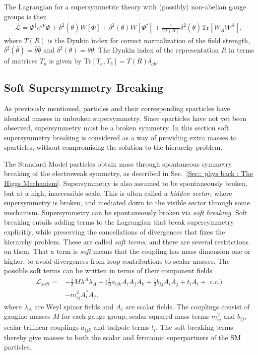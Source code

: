 \documentclass[twoside,english]{uiofysmaster}
\begin{document}
The Lagrangian for a supersymmetric theory with (possibly) non-abelian gauge groups is then
\begin{align}
\mathcal{L} = \Phi^{\dagger} e^{qV} \Phi + \delta^2 (\bar{\theta}) W[\Phi] + \delta^2 (\theta) W[\Phi^{\dagger}] + \frac{1}{2T(R)} \delta^2 (\bar{\theta}) \text{Tr}[W_AW^A],
\end{align}
where $T(R)$ is the Dynkin index for correct normalization of the field strength, $\delta^2(\bar{\theta}) = \bar{\theta} \bar{\theta}$ and $\delta^2(\theta) = \theta \theta$. The Dynkin index of the representation $R$ in terms of matrices $T_a$ is given by $\text{Tr}[T_a, T_b] = T(R) \delta_{ab}$.

\subsection{Soft Supersymmetry Breaking}\label{Sec:: phys back : Soft Supersymmetry Breaking}

As previously mentioned, particles and their corresponding sparticles have identical masses in unbroken supersymmetry. Since sparticles have not yet been observed, supersymmetry must be a broken symmetry. In this section soft supersymmetry breaking is considered as a way of providing extra masses to sparticles, without compromising the solution to the hierarchy problem.

The Standard Model particles obtain mass through spontaneous symmetry breaking of the electroweak symmetry, as described in Sec.~\ref{Sec:: phys back : The Higgs Mechanism}. Supersymmetry is also assumed to be spontaneously broken, but at a high, inaccessible scale. This is often called a \textit{hidden sector}, where supersymmetry is broken, and mediated down to the visible sector through some mechanism. Supersymmetry can be spontaneously broken via \textit{soft breaking}. Soft breaking entails adding terms to the Lagrangian that break supersymmetry explicitly, while preserving the cancellations of divergences that fixes the hierarchy problem. These are called \textit{soft terms}, and there are several restrictions on them. That a term is \textit{soft} means that the coupling has mass dimension one or higher, to avoid divergences from loop contributions to scalar masses. The possible soft terms can be written in terms of their component fields
\begin{align}\label{Eq:: phys back : Soft breaking terms}
\mathcal{L}_{soft} =& - \frac{1}{2} M \lambda^A \lambda_A - \Big(\frac{1}{6} a_{ijk} A_i A_j A_k + \frac{1}{2} b_{ij} A_i A_j + t_i A_i  + \text{ c.c.} \Big) \nonumber \\& - m_{ij}^2 A_i^*A_j,
\end{align}
where $\lambda_A$ are Weyl spinor fields and $A_i$ are scalar fields. The couplings consist of gaugino masses $M$ for each gauge group, scalar squared-mass terms $m_{ij}^2$ and $b_{ij}$, scalar trilinear couplings $a_{ijk}$ and tadpole terms $t_i$. The soft breaking terms thereby give masses to both the scalar and fermionic superpartners of the SM particles.
\end{document}
